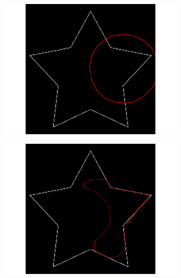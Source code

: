 \begin{figure}[H]
\begin{subfigure}[c]{0.3\linewidth}
\centering
\includegraphics[width=\textwidth]{Chapters/Images/Init/vfcusym1}
\caption{}
\end{subfigure}
\begin{subfigure}[c]{0.3\linewidth}
\centering
\includegraphics[width=\textwidth]{Chapters/Images/Init/vfcusym2}
\caption{}
\end{subfigure}
\begin{subfigure}[c]{0.3\linewidth}
\centering

\end{subfigure}
\end{figure}
